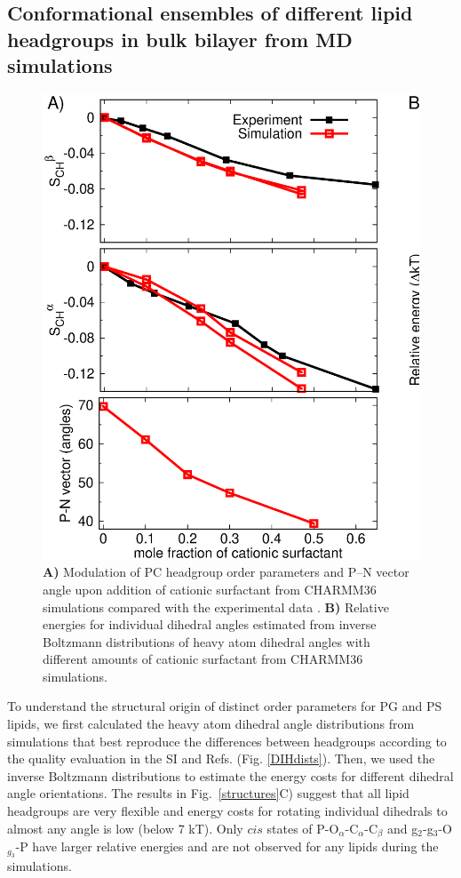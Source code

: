 \documentclass[aps,prl,superscriptaddress,twocolumn]{revtex4}
\begin{document}
\subsection{Conformational ensembles of different lipid headgroups in bulk bilayer from MD simulations}

\begin{figure}[bt]
  \centering
  \includegraphics[width=18.0cm]{./Figs/HGorderparametersPCvsSURFchangeDIHEDRALSlog.eps}
  \caption{\label{changesWITHsurf}
    \textbf{A)} Modulation of PC headgroup order parameters and P--N vector angle upon addition of cationic surfactant
    from CHARMM36 simulations compared with the experimental data \cite{scherer89}.
    \textbf{B)} Relative energies for individual dihedral angles estimated from inverse Boltzmann distributions of heavy atom dihedral angles
    with different amounts of cationic surfactant from CHARMM36 simulations.
  }
\end{figure}

To understand the structural origin of distinct order parameters for PG and PS lipids,
we first calculated the heavy atom dihedral angle distributions from simulations
that best reproduce the differences between headgroups according to the quality
evaluation in the SI and Refs. \cite{botan15,antila19} (Fig. \ref{DIHdists}).
Then, we used the inverse Boltzmann distributions to estimate the
energy costs for different dihedral angle orientations.
The results in Fig.~\ref{structures}C) suggest that all lipid headgroups are very flexible and
energy costs for rotating individual dihedrals to almost any angle is low (below 7 kT).
Only $cis$ states of P-O$_\alpha$-C$_\alpha$-C$_\beta$ and g$_2$-g$_3$-O$_{g_3}$-P have larger relative
energies and are not observed for any lipids during the simulations.
\end{document}
